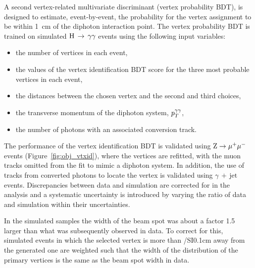 A second vertex-related multivariate discriminant (vertex probability BDT),
is designed to estimate, event-by-event, the probability for the vertex
assignment to be within \SI{1}{cm} of the diphoton interaction point.
The vertex probability BDT is trained on simulated $\mathrm{H}\,\rightarrow\,\gamma\gamma$ events using
the following input variables:
\begin{itemize}
        \item the number of vertices in each event,
        \item the values of the vertex identification BDT score for
                the three most probable vertices in each event,
        \item the distances between the chosen vertex and the second and
                third choices,
        \item the transverse momentum of the diphoton system, $p_T^{\gamma\gamma}$,
        \item the number of photons with an associated conversion track.
\end{itemize}


The performance of the vertex identification BDT is
validated using $\mathrm{Z}\rightarrow{\mu^{+}\mu^{-}}$ events (Figure~\ref{fig:obj_vtxid}), where
the vertices are refitted, with the muon tracks omitted from the fit to
mimic a diphoton system.
In addition, the
use of tracks from converted photons to locate the vertex is validated
using $\gamma\,+\,\textrm{jet}$ events. Discrepancies between data and simulation are
corrected for in the analysis and a systematic uncertainty is introduced by
varying the ratio of data and simulation within their uncertainties.

In the simulated samples the width of the beam spot 
was about a factor 1.5 larger than
what was subsequently observed in data. To correct for this,
simulated events in which the selected vertex is more than /SI{0.1}{cm}
away from the generated one are weighted such that the width of the
distribution of the primary vertices is the same as the beam spot
 width in data.

